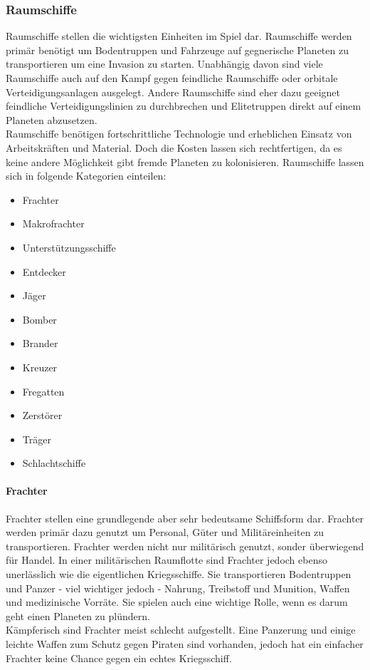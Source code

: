 \documentclass[11pt, a4paper]{article}
\begin{document}
\subsubsection{Raumschiffe}
Raumschiffe stellen die wichtigsten Einheiten im Spiel dar. Raumschiffe werden primär benötigt um Bodentruppen
und Fahrzeuge auf gegnerische Planeten zu transportieren um eine Invasion zu starten. Unabhängig davon sind
viele Raumschiffe auch auf den Kampf gegen feindliche Raumschiffe oder orbitale Verteidigungsanlagen
ausgelegt. Andere Raumschiffe sind eher dazu geeignet feindliche Verteidigungslinien zu durchbrechen und
Elitetruppen direkt auf einem Planeten abzusetzen.\\
Raumschiffe benötigen fortschrittliche Technologie und erheblichen Einsatz von Arbeitskräften und Material.
Doch die Kosten lassen sich rechtfertigen, da es keine andere Möglichkeit gibt fremde Planeten zu kolonisieren.
Raumschiffe lassen sich in folgende Kategorien einteilen:
\begin{itemize}
	\item Frachter
	\item Makrofrachter
	\item Unterstützungsschiffe
	\item Entdecker
	\item Jäger
	\item Bomber
	\item Brander
	\item Kreuzer
	\item Fregatten
	\item Zerstörer
	\item Träger
	\item Schlachtschiffe
\end{itemize}
%
\paragraph{Frachter}
Frachter stellen eine grundlegende aber sehr bedeutsame Schiffsform dar. Frachter werden primär dazu genutzt
um Personal, Güter und Militäreinheiten zu transportieren. Frachter werden nicht nur militärisch genutzt,
sonder überwiegend für Handel. In einer militärischen Raumflotte sind Frachter jedoch ebenso unerlässlich wie
die eigentlichen Kriegsschiffe. Sie transportieren Bodentruppen und Panzer - viel wichtiger jedoch -
Nahrung, Treibstoff und Munition, Waffen und medizinische Vorräte. Sie spielen auch eine wichtige Rolle, wenn
es darum geht einen Planeten zu plündern.\\
Kämpferisch sind Frachter meist schlecht aufgestellt. Eine Panzerung und einige leichte Waffen zum Schutz
gegen Piraten sind vorhanden, jedoch hat ein einfacher Frachter keine Chance gegen ein echtes Kriegsschiff.
%
\end{document}
